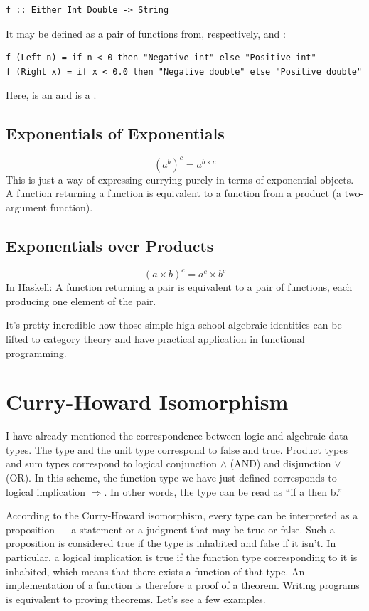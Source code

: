 \begin{Verbatim}
f :: Either Int Double -> String
\end{Verbatim}
It may be defined as a pair of functions from, respectively,
 and :

\begin{verbatim}
f (Left n) = if n < 0 then "Negative int" else "Positive int"
f (Right x) = if x < 0.0 then "Negative double" else "Positive double"
\end{verbatim}
Here,  is an  and  is a .

\subsection{Exponentials of Exponentials}

\[(a^{b})^{c} = a^{b \times c}\]
This is just a way of expressing currying purely in terms of exponential
objects. A function returning a function is equivalent to a function
from a product (a two-argument function).

\subsection{Exponentials over Products}

\[(a \times b)^{c} = a^{c} \times b^{c}\]
In Haskell: A function returning a pair is equivalent to a pair of
functions, each producing one element of the pair.

It's pretty incredible how those simple high-school algebraic identities
can be lifted to category theory and have practical application in
functional programming.

\section{Curry-Howard Isomorphism}

I have already mentioned the correspondence between logic and algebraic
data types. The  type and the unit type \code{()}
correspond to false and true. Product types and sum types correspond to
logical conjunction $\wedge$ (AND) and disjunction $\vee$ (OR). In this scheme, the
function type we have just defined corresponds to logical implication $\Rightarrow$.
In other words, the type  can be read as ``if
a then b.''

According to the Curry-Howard isomorphism, every type can be interpreted
as a proposition --- a statement or a judgment that may be true or
false. Such a proposition is considered true if the type is inhabited
and false if it isn't. In particular, a logical implication is true if
the function type corresponding to it is inhabited, which means that
there exists a function of that type. An implementation of a function is
therefore a proof of a theorem. Writing programs is equivalent to
proving theorems. Let's see a few examples.

